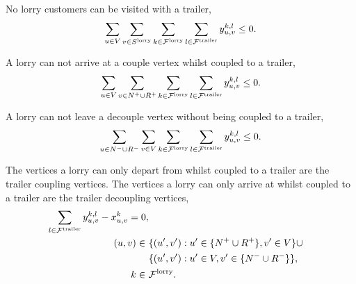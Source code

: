 

No lorry customers can be visited with a trailer,
\begin{align}
  \label{eq:lorrycustomer}
  \sum_{u \in V }
  \sum_{v \in S^{\rm lorry} }
  \sum_{k \in \mathcal F^{\rm lorry} }
  \sum_{l \in \mathcal F^{\rm trailer} }
   y^{k,l}_{u,v}  \leq 0 .
\end{align}


A lorry can not arrive at a couple vertex whilst coupled to a trailer,
\begin{align}
  \sum_{u \in V }
  \sum_{v \in N^+ \cup R^+ }
  \sum_{k \in \mathcal F^{\rm lorry} }
  \sum_{l \in \mathcal F^{\rm trailer} }
   y^{k,l}_{u,v}  \leq 0 .
\end{align}

A lorry can not leave  a decouple vertex without being coupled to a trailer,
\begin{align}
  \sum_{u \in N^- \cup R^- }
  \sum_{v \in V }
  \sum_{k \in \mathcal F^{\rm lorry} }
  \sum_{l \in \mathcal F^{\rm trailer} }
   y^{k,l}_{u,v}  \leq 0 .
\end{align}


The vertices a lorry can only depart from whilst coupled to a trailer are the trailer coupling vertices.
The vertices a lorry can only arrive at whilst coupled to a trailer are the trailer decoupling vertices,
\begin{align}
   \sum_{l \in \mathcal F^{\rm trailer}}
   y^{k,l}_{u,v}  - x^k_{u,v} = 0 ,  \\
   (u,v) \in \
    &  \{ (u',v'): u' \in  \{  N^+ \cup R^+  \}   , v' \in V   \}
   \cup \notag \\
    & \{  (u',v'): u' \in V,  v' \in \{ N^- \cup R^-  \} \}, \notag\\
     k  \in \ &   \mathcal F^{\rm lorry}. \notag
\end{align}






